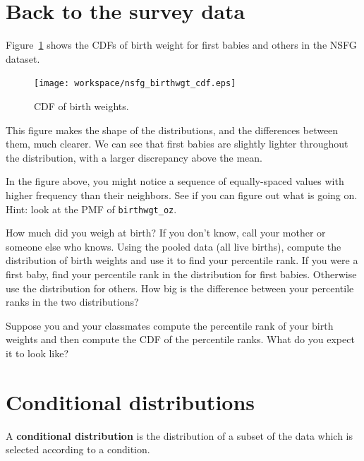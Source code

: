 \documentclass[12pt]{book}
\begin{document}
\section{Back to the survey data}

Figure~\ref{nsfg_birthwgt_cdf} shows the CDFs of birth weight for
first babies and others in the NSFG dataset.

\begin{figure}
\centerline{\texttt{[image: workspace/nsfg\_birthwgt\_cdf.eps]}}
\caption{CDF of birth weights.}
\label{nsfg_birthwgt_cdf}
\end{figure}

This figure makes the shape of the distributions, and the differences
between them, much clearer.  We can see that first babies are slightly
lighter throughout the distribution, with a larger discrepancy above 
the mean.

\begin{ex}

In the figure above, you might notice
a sequence of equally-spaced values with higher frequency than
their neighbors.  See if you can figure out what is going on.
Hint: look at the PMF of \verb"birthwgt_oz".

\end{ex}

\begin{ex}
How much did you weigh at birth?  If you don't know, call your mother
or someone else who knows.  Using the pooled data (all live births),
compute the distribution of birth weights and use it to find your
percentile rank.  If you were a first baby, find your percentile rank
in the distribution for first babies.  Otherwise use the distribution
for others.  How big is the difference between your percentile ranks
in the two distributions?
\end{ex}

\begin{ex}
Suppose you and your classmates compute the percentile rank of your
birth weights and then compute the CDF of the percentile ranks.  What do
you expect it to look like?
\end{ex}


\section{Conditional distributions}

A {\bf conditional distribution} is the distribution of a subset of
the data which is selected according to a condition.
\end{document}
